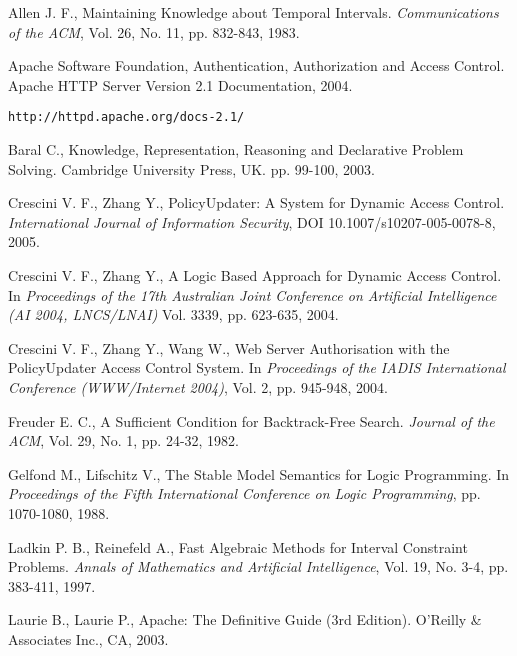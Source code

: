 \documentclass[11pt]{report}
\begin{document}
  \begin{thebibliography}{M}
      Allen J. F.,
      Maintaining Knowledge about Temporal Intervals.
      {\em Communications of the ACM},
      Vol. 26, No. 11, pp. 832-843,
      1983.

      Apache Software Foundation,
      Authentication, Authorization and Access Control.
      Apache HTTP Server Version 2.1 Documentation,
      2004.

      {\tt http://httpd.apache.org/docs-2.1/}

      Baral C.,
      Knowledge, Representation, Reasoning and Declarative Problem Solving.
      Cambridge University Press, UK.
      pp. 99-100,
      2003.

      Crescini V. F., Zhang Y.,
      PolicyUpdater: A System for Dynamic Access Control.
      {\em International Journal of Information Security},
      DOI 10.1007/s10207-005-0078-8,
      2005.

      Crescini V. F., Zhang Y.,
      A Logic Based Approach for Dynamic Access Control.
      In {\em Proceedings of the 17th Australian Joint Conference on Artificial Intelligence (AI 2004, LNCS/LNAI)}
      Vol. 3339, pp. 623-635,
      2004.
      
      Crescini V. F., Zhang Y., Wang W.,
      Web Server Authorisation with the PolicyUpdater Access Control System.
      In {\em Proceedings of the IADIS International Conference (WWW/Internet 2004)},
      Vol. 2, pp. 945-948,
      2004.

      Freuder E. C.,
      A Sufficient Condition for Backtrack-Free Search.
      {\em Journal of the ACM},
      Vol. 29, No. 1, pp. 24-32,
      1982.

      Gelfond M., Lifschitz V.,
      The Stable Model Semantics for Logic Programming.
      In {\em Proceedings of the Fifth International Conference on Logic Programming},
      pp. 1070-1080,
      1988.

      Ladkin P. B., Reinefeld A.,
      Fast Algebraic Methods for Interval Constraint Problems.
      {\em Annals of Mathematics and Artificial Intelligence},
      Vol. 19, No. 3-4, pp. 383-411,
      1997.

      Laurie B., Laurie P.,
      Apache: The Definitive Guide (3rd Edition).
      O'Reilly \& Associates Inc., CA,
      2003.


\end{thebibliography}
\end{document}
